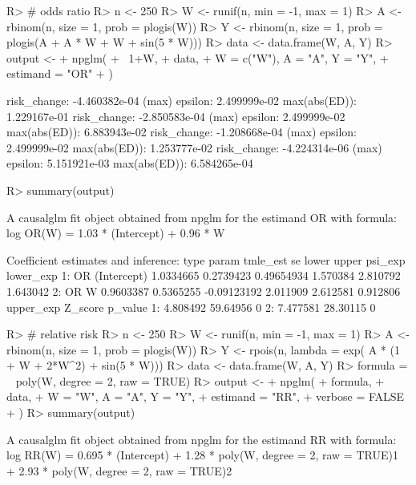 \documentclass[
]{jss}
\begin{document}
\begin{CodeChunk}
\begin{CodeInput}
R> # odds ratio
R> n <- 250
R> W <- runif(n, min = -1,  max = 1)
R> A <- rbinom(n, size = 1, prob = plogis(W))
R> Y <- rbinom(n, size =  1, prob = plogis(A + A * W + W + sin(5 * W)))
R> data <- data.frame(W, A, Y)
R> output <-
+   npglm(
+     ~1+W,
+     data,
+     W = c("W"), A = "A", Y = "Y",
+     estimand = "OR" 
+   )
\end{CodeInput}
\begin{CodeOutput}
risk_change: -4.460382e-04 (max) epsilon: 2.499999e-02 max(abs(ED)): 1.229167e-01
risk_change: -2.850583e-04 (max) epsilon: 2.499999e-02 max(abs(ED)): 6.883943e-02
risk_change: -1.208668e-04 (max) epsilon: 2.499999e-02 max(abs(ED)): 1.253777e-02
risk_change: -4.224314e-06 (max) epsilon: 5.151921e-03 max(abs(ED)): 6.584265e-04
\end{CodeOutput}
\begin{CodeInput}
R> summary(output)
\end{CodeInput}
\begin{CodeOutput}
A causalglm fit object obtained from npglm for the estimand OR with formula: 
log OR(W) = 1.03 * (Intercept) + 0.96 * W

Coefficient estimates and inference:
   type       param  tmle_est        se       lower    upper  psi_exp lower_exp
1:   OR (Intercept) 1.0334665 0.2739423  0.49654934 1.570384 2.810792  1.643042
2:   OR           W 0.9603387 0.5365255 -0.09123192 2.011909 2.612581  0.912806
   upper_exp  Z_score p_value
1:  4.808492 59.64956       0
2:  7.477581 28.30115       0
\end{CodeOutput}
\begin{CodeInput}
R> # relative risk
R> n <- 250
R> W <- runif(n, min = -1,  max = 1)
R> A <- rbinom(n, size = 1, prob = plogis(W))
R> Y <- rpois(n, lambda = exp( A * (1 + W + 2*W^2)  + sin(5 * W)))
R> data <- data.frame(W, A, Y)
R> formula = ~ poly(W, degree = 2, raw = TRUE) 
R> output <-
+   npglm(
+     formula,
+     data,
+     W = "W", A = "A", Y = "Y",
+     estimand = "RR",
+     verbose = FALSE
+   )
R> summary(output)
\end{CodeInput}
\begin{CodeOutput}
A causalglm fit object obtained from npglm for the estimand RR with formula: 
log RR(W) = 0.695 * (Intercept) + 1.28 * poly(W, degree = 2, raw = TRUE)1 + 2.93 * poly(W, degree = 2, raw = TRUE)2


\end{CodeOutput}
\end{CodeChunk}
\end{document}
